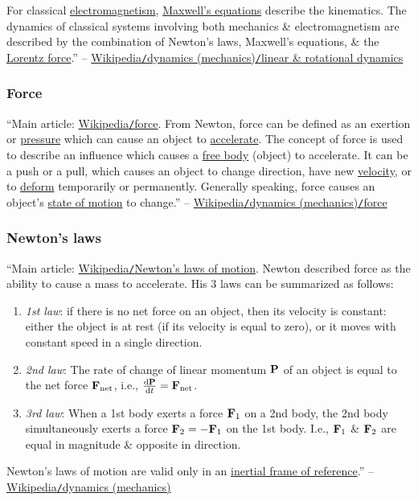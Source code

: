\documentclass{article}
\begin{document}
For classical \href{https://en.wikipedia.org/wiki/Electromagnetism}{electromagnetism}, \href{https://en.wikipedia.org/wiki/Maxwell%27s_equations}{Maxwell's equations} describe the kinematics. The dynamics of classical systems involving both mechanics \& electromagnetism are described by the combination of Newton's laws, Maxwell's equations, \& the \href{https://en.wikipedia.org/wiki/Lorentz_force}{Lorentz force}.'' -- \href{https://en.wikipedia.org/wiki/Dynamics_(mechanics)#Linear_and_rotational_dynamics}{Wikipedia{\tt/}dynamics (mechanics){\tt/}linear \& rotational dynamics}

\subsubsection{Force}
``Main article: \href{https://en.wikipedia.org/wiki/Force}{Wikipedia{\tt/}force}. From Newton, force can be defined as an exertion or \href{https://en.wikipedia.org/wiki/Pressure}{pressure} which can cause an object to \href{https://en.wikipedia.org/wiki/Accelerate}{accelerate}. The concept of force is used to describe an influence which causes a \href{https://en.wikipedia.org/wiki/Free_body}{free body} (object) to accelerate. It can be a push or a pull, which causes an object to change direction, have new \href{https://en.wikipedia.org/wiki/Velocity}{velocity}, or to \href{https://en.wikipedia.org/wiki/Deformation_(mechanics)}{deform} temporarily or permanently. Generally speaking, force causes an object's \href{https://en.wikipedia.org/wiki/Motion_(physics)}{state of motion} to change.'' -- \href{https://en.wikipedia.org/wiki/Dynamics_(mechanics)#Force}{Wikipedia{\tt/}dynamics (mechanics){\tt/}force}

\subsubsection{Newton's laws}
``Main article: \href{https://en.wikipedia.org/wiki/Newton%27s_laws_of_motion}{Wikipedia{\tt/}Newton's laws of motion}. Newton described force as the ability to cause a mass to accelerate. His 3 laws can be summarized as follows:
\begin{enumerate}
	\item \textit{1st law}: if there is no net force on an object, then its velocity is constant: either the object is at rest (if its velocity is equal to zero), or it moves with constant speed in a single direction.
	\item \textit{2nd law}: The rate of change of linear momentum ${\bf P}$ of an object is equal to the net force ${\bf F}_{\rm net}$, i.e., $\frac{{\rm d}{\bf P}}{{\rm d}t} = {\bf F}_{\rm net}$.
	\item \textit{3rd law}: When a 1st body exerts a force ${\bf F}_1$ on a 2nd body, the 2nd body simultaneously exerts a force ${\bf F}_2 = -{\bf F}_1$ on the 1st body. I.e., ${\bf F}_1$ \& ${\bf F}_2$ are equal in magnitude \& opposite in direction.
\end{enumerate}
Newton's laws of motion are valid only in an \href{https://en.wikipedia.org/wiki/Inertial_frame_of_reference}{inertial frame of reference}.'' -- \href{https://en.wikipedia.org/wiki/Dynamics_(mechanics)}{Wikipedia{\tt/}dynamics (mechanics)}
\end{document}

